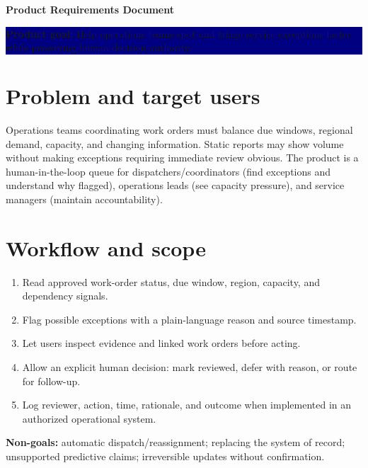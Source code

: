 \documentclass[10pt,a4paper]{article}
\begin{document}
\begin{center}{\LARGE\bfseries\color{navy} Product Requirements Document}\par\vspace{2pt}{\large Service Operations Exception Triage}\par\vspace{3pt}{\small October 2026}\end{center}\vspace{-4pt}
\noindent\colorbox{navy}{\parbox{\dimexpr\linewidth-2\fboxsep}{\color{white}\small\textbf{Product goal:} Help operations teams spot and triage service exceptions faster while preserving human decision authority.}}
\section{Problem and target users}
Operations teams coordinating work orders must balance due windows, regional demand, capacity, and changing information. Static reports may show volume without making exceptions requiring immediate review obvious. The product is a human-in-the-loop queue for dispatchers/coordinators (find exceptions and understand why flagged), operations leads (see capacity pressure), and service managers (maintain accountability).\\
\section{Workflow and scope}
\begin{enumerate}\item Read approved work-order status, due window, region, capacity, and dependency signals.\item Flag possible exceptions with a plain-language reason and source timestamp.\item Let users inspect evidence and linked work orders before acting.\item Allow an explicit human decision: mark reviewed, defer with reason, or route for follow-up.\item Log reviewer, action, time, rationale, and outcome when implemented in an authorized operational system.\end{enumerate}
\textbf{Non-goals:} automatic dispatch/reassignment; replacing the system of record; unsupported predictive claims; irreversible updates without confirmation.
\end{document}
